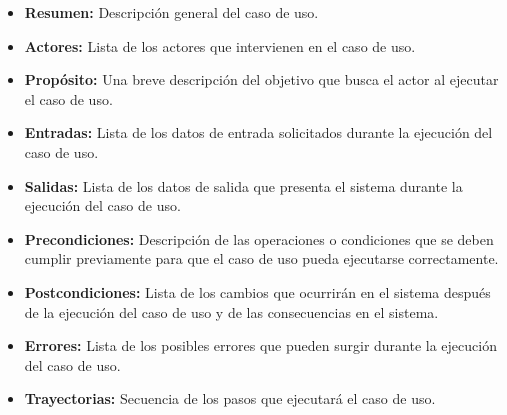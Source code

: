     \begin{itemize}
	\item {\bf Resumen:} Descripción general del caso de uso.
	\item {\bf Actores:} Lista de los actores que intervienen en el caso de uso.
	\item {\bf Propósito:} Una breve descripción del objetivo que busca el actor al ejecutar el caso de uso.
	\item {\bf Entradas:} Lista de los datos de entrada solicitados durante la ejecución del caso de uso.
	\item {\bf Salidas:} Lista de los datos de salida que presenta el sistema durante la ejecución del caso de uso.
	\item {\bf Precondiciones:} Descripción de las operaciones o condiciones que se deben cumplir previamente para que el caso de uso pueda ejecutarse correctamente.
	\item {\bf Postcondiciones:} Lista de los cambios que ocurrirán en el sistema después de la ejecución del caso de uso y de las consecuencias en el sistema.
	\item {\bf Errores:} Lista de los posibles errores que pueden surgir durante la ejecución del caso de uso.
	\item {\bf Trayectorias:} Secuencia de los pasos que ejecutará el caso de uso.
    \end{itemize}
    